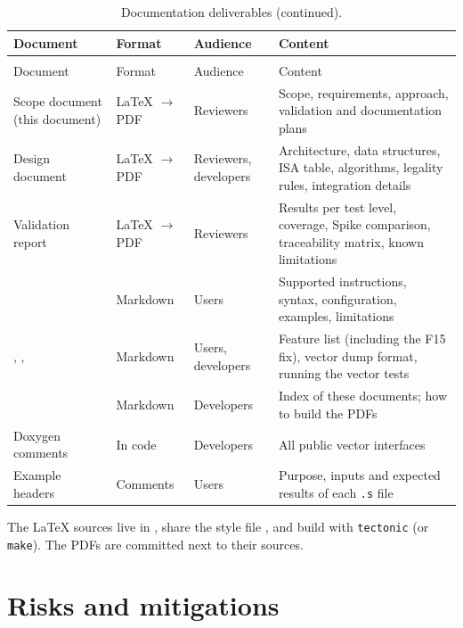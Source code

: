 \documentclass[11pt]{article}
\begin{document}
\small
\begin{longtable}{@{}L{4.6cm}L{2.0cm}L{2.6cm}L{5.7cm}@{}}
\caption{Documentation deliverables.}\label{tab:docs}\\
\toprule
Document & Format & Audience & Content \\
\midrule
\endfirsthead
\caption[]{Documentation deliverables (continued).}\\
\toprule
Document & Format & Audience & Content \\
\midrule
\endhead
Scope document (this document) & LaTeX $\rightarrow$ PDF & Reviewers & Scope, requirements, approach, validation and documentation plans \\
Design document & LaTeX $\rightarrow$ PDF & Reviewers, developers & Architecture, data structures, ISA table, algorithms, legality rules, integration details \\
Validation report & LaTeX $\rightarrow$ PDF & Reviewers & Results per test level, coverage, Spike comparison, traceability matrix, known limitations \\
 & Markdown & Users & Supported instructions, syntax, configuration, examples, limitations \\
, ,  & Markdown & Users, developers & Feature list (including the F15 fix), vector dump format, running the vector tests \\
 & Markdown & Developers & Index of these documents; how to build the PDFs \\
Doxygen comments & In code & Developers & All public vector interfaces \\
Example headers & Comments & Users & Purpose, inputs and expected results of each \texttt{.s} file \\
\bottomrule
\end{longtable}
\normalsize

The LaTeX sources live in , share the style file ,
and build with \texttt{tectonic} (or \texttt{make}). The PDFs are committed next to their sources.

\section{Risks and mitigations}\label{sec:risks}
\end{document}
